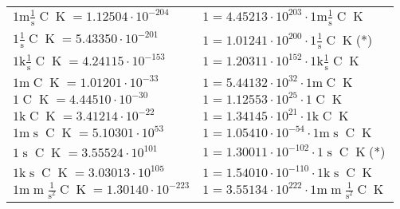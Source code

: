 \begin{center}
\begin{longtable}{l l}
{\color{gray}$1 \bm{\mathrm{ m}}{}\frac1{\operatorname{s}}{\operatorname{C}}{\operatorname{K}} = 1.12504\cdot10^{-204} $}   & {\color{gray}$ 1 = 4.45213\cdot10^{203} \cdot 1 \bm{\mathrm{ m}}{}\frac1{\operatorname{s}}{\operatorname{C}}{\operatorname{K}}$}  \\
{\color{black}$1 \bm{\mathrm{ }}{}\frac1{\operatorname{s}}{\operatorname{C}}{\operatorname{K}} = 5.43350\cdot10^{-201} $}   & {\color{black}$ 1 = 1.01241\cdot10^{200} \cdot 1 \bm{\mathrm{ }}{}\frac1{\operatorname{s}}{\operatorname{C}}{\operatorname{K}}$}\quad(*)\\
{\color{gray}$1 \bm{\mathrm{ k}}{}\frac1{\operatorname{s}}{\operatorname{C}}{\operatorname{K}} = 4.24115\cdot10^{-153} $}   & {\color{gray}$ 1 = 1.20311\cdot10^{152} \cdot 1 \bm{\mathrm{ k}}{}\frac1{\operatorname{s}}{\operatorname{C}}{\operatorname{K}}$}  \\
{\color{gray}$1 \bm{\mathrm{ m}}{}{}{\operatorname{C}}{\operatorname{K}} = 1.01201\cdot10^{-33} $}   & {\color{gray}$ 1 = 5.44132\cdot10^{32} \cdot 1 \bm{\mathrm{ m}}{}{}{\operatorname{C}}{\operatorname{K}}$}  \\
{\color{black}$1 \bm{\mathrm{ }}{}{}{\operatorname{C}}{\operatorname{K}} = 4.44510\cdot10^{-30} $}   & {\color{black}$ 1 = 1.12553\cdot10^{25} \cdot 1 \bm{\mathrm{ }}{}{}{\operatorname{C}}{\operatorname{K}}$}  \\
{\color{gray}$1 \bm{\mathrm{ k}}{}{}{\operatorname{C}}{\operatorname{K}} = 3.41214\cdot10^{-22} $}   & {\color{gray}$ 1 = 1.34145\cdot10^{21} \cdot 1 \bm{\mathrm{ k}}{}{}{\operatorname{C}}{\operatorname{K}}$}  \\
{\color{gray}$1 \bm{\mathrm{ m}}{}{\operatorname{s}}{\operatorname{C}}{\operatorname{K}} = 5.10301\cdot10^{53} $}   & {\color{gray}$ 1 = 1.05410\cdot10^{-54} \cdot 1 \bm{\mathrm{ m}}{}{\operatorname{s}}{\operatorname{C}}{\operatorname{K}}$}  \\
{\color{black}$1 \bm{\mathrm{ }}{}{\operatorname{s}}{\operatorname{C}}{\operatorname{K}} = 3.55524\cdot10^{101} $}   & {\color{black}$ 1 = 1.30011\cdot10^{-102} \cdot 1 \bm{\mathrm{ }}{}{\operatorname{s}}{\operatorname{C}}{\operatorname{K}}$}\quad(*)\\
{\color{gray}$1 \bm{\mathrm{ k}}{}{\operatorname{s}}{\operatorname{C}}{\operatorname{K}} = 3.03013\cdot10^{105} $}   & {\color{gray}$ 1 = 1.54010\cdot10^{-110} \cdot 1 \bm{\mathrm{ k}}{}{\operatorname{s}}{\operatorname{C}}{\operatorname{K}}$}  \\
{\color{gray}$1 \bm{\mathrm{ m}}{\operatorname{m}}\frac1{\operatorname{s}^2}{\operatorname{C}}{\operatorname{K}} = 1.30140\cdot10^{-223} $}   & {\color{gray}$ 1 = 3.55134\cdot10^{222} \cdot 1 \bm{\mathrm{ m}}{\operatorname{m}}\frac1{\operatorname{s}^2}{\operatorname{C}}{\operatorname{K}}$}  \\

\end{longtable}
\end{center}
